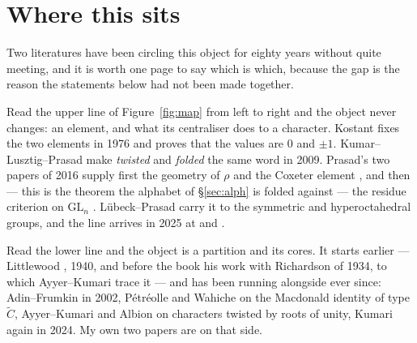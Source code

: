 \documentclass[11pt,a4paper]{article}
\theoremstyle{definition}
\newcommand{\GL}{\mathrm{GL}}
\begin{document}
\section{Where this sits}\label{sec:map}

Two literatures have been circling this object for eighty years without quite meeting, and it is
worth one page to say which is which, because the gap is the reason the statements below had not
been made together.

Read the upper line of Figure~\ref{fig:map} from left to right and the object never changes: an
element, and what its centraliser does to a character. Kostant \cite{Kostant76} fixes the two
elements in 1976 and proves that the values are $0$ and $\pm1$. Kumar--Lusztig--Prasad \cite{KLP09}
make \emph{twisted} and \emph{folded} the same word in 2009. Prasad's two papers of 2016 supply
first the geometry of $\rho$ and the Coxeter element \cite{Prasad16}, and then --- this is the
theorem the alphabet of \S\ref{sec:alph} is folded against --- the residue criterion on $\GL_n$
\cite{Prasad16b}. L\"ubeck--Prasad \cite{LP20} carry it to the symmetric and hyperoctahedral groups,
and the line arrives in 2025 at \cite{NPP25} and \cite{Polo25}.

Read the lower line and the object is a partition and its cores. It starts earlier --- Littlewood
\cite{Li40}, 1940, and before the book his work with Richardson of 1934, to which Ayyer--Kumari
\cite[\S1]{AK25} trace it --- and has been running alongside ever since: Adin--Frumkin \cite{AF02} in 2002,
P\'etr\'eolle \cite{Petreolle15} and Wahiche \cite{Wahiche23} on the Macdonald identity of type
$\widetilde C$, Ayyer--Kumari \cite{AK22} and Albion \cite{Alb23} on characters twisted by roots of
unity, Kumari \cite{Kum24} again in 2024. My own two papers \cite{OP1,OP2} are on that side.
\end{document}

